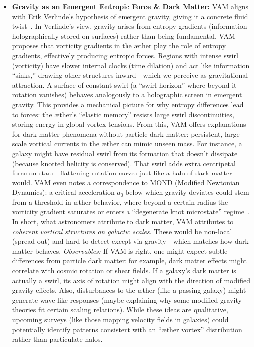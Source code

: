 \documentclass[a4paper,12pt]{article}
\begin{document}
\begin{itemize}

\item 
\textbf{Gravity as an Emergent Entropic Force \& Dark Matter:} VAM aligns with Erik Verlinde’s hypothesis of emergent gravity, giving it a concrete fluid twist~\cite{verlinde2011origin}. In Verlinde’s view, gravity arises from entropy gradients (information holographically stored on surfaces) rather than being fundamental. VAM proposes that vorticity gradients in the æther play the role of entropy gradients, effectively producing entropic forces. Regions with intense swirl (vorticity) have slower internal clocks (time dilation) and act like information “sinks,” drawing other structures inward---which we perceive as gravitational attraction. A surface of constant swirl (a “swirl horizon” where beyond it rotation vanishes) behaves analogously to a holographic screen in emergent gravity. This provides a mechanical picture for why entropy differences lead to forces: the æther’s “elastic memory” resists large swirl discontinuities, storing energy in global vortex tensions. From this, VAM offers explanations for dark matter phenomena without particle dark matter: persistent, large-scale vortical currents in the æther can mimic unseen mass. For instance, a galaxy might have residual swirl from its formation that doesn’t dissipate (because knotted helicity is conserved). That swirl adds extra centripetal force on stars---flattening rotation curves just like a halo of dark matter would. VAM even notes a correspondence to MOND (Modified Newtonian Dynamics): a critical acceleration $a_0$ below which gravity deviates could stem from a threshold in æther behavior, where beyond a certain radius the vorticity gradient saturates or enters a “degenerate knot microstate” regime~\cite{milgrom1983mond}. In short, what astronomers attribute to dark matter, VAM attributes to \textit{coherent vortical structures on galactic scales}. These would be non-local (spread-out) and hard to detect except via gravity---which matches how dark matter behaves. \textit{Observables:} If VAM is right, one might expect subtle differences from particle dark matter: for example, dark matter effects might correlate with cosmic rotation or shear fields. If a galaxy’s dark matter is actually a swirl, its axis of rotation might align with the direction of modified gravity effects. Also, disturbances to the æther (like a passing galaxy) might generate wave-like responses (maybe explaining why some modified gravity theories fit certain scaling relations). While these ideas are qualitative, upcoming surveys (like those mapping velocity fields in galaxies) could potentially identify patterns consistent with an “æther vortex” distribution rather than particulate halos.


\end{itemize}
\end{document}
